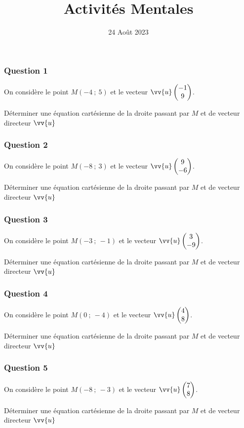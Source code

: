 \documentclass[15pt, mathserif]{beamer}
\title{Activités Mentales}
\date{24 Août 2023}
\newcommand{\vco}[2]{\begin{pmatrix} #1 \\ #2 \end{pmatrix}} %
\begin{document}
\begin{frame}
    \titlepage
\end{frame}

\begin{frame} 
	\frametitle{Question 1}
On considère le point $M\left(-4~;~5\right)$ et le vecteur $\vv{u}\vco{-1}{9}$.

\bigskip

Déterminer une équation cartésienne de la droite passant par $M$ et de vecteur directeur $\vv{u}$\end{frame}


\begin{frame} 
	\frametitle{Question 2}
On considère le point $M\left(-8~;~3\right)$ et le vecteur $\vv{u}\vco{9}{-6}$.

\bigskip

Déterminer une équation cartésienne de la droite passant par $M$ et de vecteur directeur $\vv{u}$\end{frame}


\begin{frame} 
	\frametitle{Question 3}
On considère le point $M\left(-3~;~-1\right)$ et le vecteur $\vv{u}\vco{3}{-9}$.

\bigskip

Déterminer une équation cartésienne de la droite passant par $M$ et de vecteur directeur $\vv{u}$\end{frame}


\begin{frame} 
	\frametitle{Question 4}
On considère le point $M\left(0~;~-4\right)$ et le vecteur $\vv{u}\vco{4}{8}$.

\bigskip

Déterminer une équation cartésienne de la droite passant par $M$ et de vecteur directeur $\vv{u}$\end{frame}


\begin{frame} 
	\frametitle{Question 5}
On considère le point $M\left(-8~;~-3\right)$ et le vecteur $\vv{u}\vco{7}{8}$.

\bigskip

Déterminer une équation cartésienne de la droite passant par $M$ et de vecteur directeur $\vv{u}$\end{frame}
\end{document}
